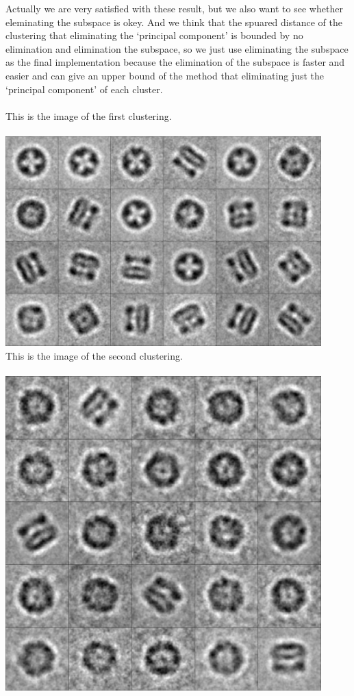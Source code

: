 \documentclass{article}
\begin{document}
Actually we are very satisfied with these result, but we also want to see whether eleminating the subspace is okey. And we think that the spuared distance of the clustering that eliminating the `principal component' is bounded by no elimination and elimination the subspace, so we just use eliminating the subspace as the final implementation because the elimination of the subspace is faster and easier and can give an upper bound of the method that eliminating just the `principal component' of each cluster.\\
~\\
This is the image of the first clustering.\\
~\\
\includegraphics[width=4.8in]{first_clustering}
~\\
This is the image of the second clustering.\\
~\\
\includegraphics[width=4.8in]{second_clustering}
\end{document}
